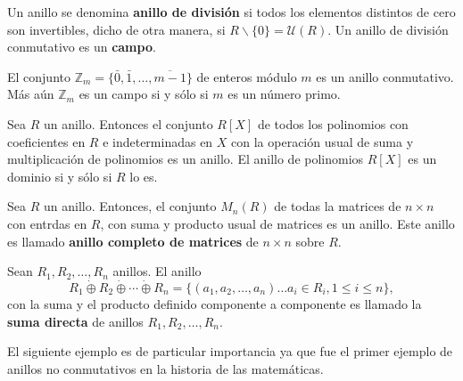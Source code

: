 Un anillo se denomina \textbf{anillo de división} si todos los elementos distintos de cero son invertibles, dicho de otra manera, si $R\backslash \{0\} = \mathcal{U}(R)$. Un anillo de división conmutativo es un \textbf{campo}.
\begin{ejemplo}
El conjunto $\mathds{Z}_m = \{ \bar{0}, \bar{1}, \dots, \overline{m-1} \}$ de enteros módulo $m$ es un anillo conmutativo. Más aún $\mathds{Z}_m$ es un campo si y sólo si $m$ es un número primo.
\end{ejemplo}
\begin{ejemplo}
Sea $R$ un anillo. Entonces el conjunto $R[X]$ de todos los polinomios con coeficientes en $R$ e indeterminadas en $X$ con la operación usual de suma y multiplicación de polinomios es un anillo. El anillo de polinomios $R[X]$ es un dominio si y sólo si $R$ lo es. 
\end{ejemplo}
\begin{ejemplo}
Sea $R$ un anillo. Entonces, el conjunto $M_n(R)$ de todas la matrices de $n\times n$ con entrdas en $R$, con suma y producto usual de matrices es un anillo. Este anillo es llamado \textbf{anillo completo de matrices} de $n\times n$ sobre $R$.
\end{ejemplo}
\begin{ejemplo}
Sean $R_1, R_2, \dots, R_n$ anillos. El anillo \[ R_1\dot{\oplus}R_2\dot{\oplus}\cdots\dot{\oplus} R_n = \{ (a_1,a_2,\dots,a_n) \dots a_i \in R_i, 1\leq i \leq n \},  \] con la suma y el producto definido componente a componente es llamado la \textbf{suma directa} de anillos $R_1, R_2,\dots,R_n$.
\end{ejemplo}
El siguiente ejemplo es de particular importancia ya que fue el primer ejemplo de anillos no conmutativos en la historia de las matemáticas. 
